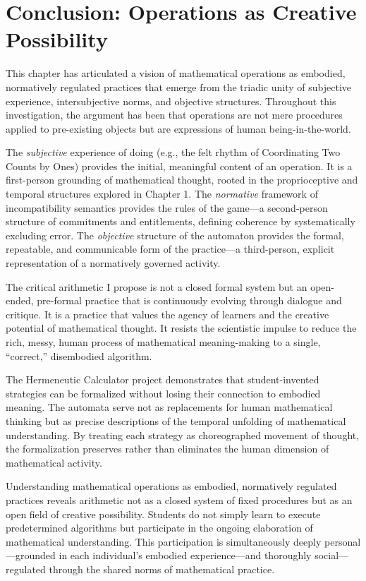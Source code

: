 \documentclass[12pt]{book}
\begin{document}
\section{Conclusion: Operations as Creative Possibility}

This chapter has articulated a vision of mathematical operations as embodied, normatively regulated practices that emerge from the triadic unity of subjective experience, intersubjective norms, and objective structures. Throughout this investigation, the argument has been that operations are not mere procedures applied to pre-existing objects but are expressions of human being-in-the-world.

The \textit{subjective} experience of doing (e.g., the felt rhythm of Coordinating Two Counts by Ones) provides the initial, meaningful content of an operation. It is a first-person grounding of mathematical thought, rooted in the proprioceptive and temporal structures explored in Chapter 1. The \textit{normative} framework of incompatibility semantics provides the rules of the game---a second-person structure of commitments and entitlements, defining coherence by systematically excluding error. The \textit{objective} structure of the automaton provides the formal, repeatable, and communicable form of the practice---a third-person, explicit representation of a normatively governed activity.

The critical arithmetic I propose is not a closed formal system but an open-ended, pre-formal practice that is continuously evolving through dialogue and critique. It is a practice that values the agency of learners and the creative potential of mathematical thought. It resists the scientistic impulse to reduce the rich, messy, human process of mathematical meaning-making to a single, \enquote{correct,} disembodied algorithm.

The Hermeneutic Calculator project demonstrates that student-invented strategies can be formalized without losing their connection to embodied meaning. The automata serve not as replacements for human mathematical thinking but as precise descriptions of the temporal unfolding of mathematical understanding. By treating each strategy as choreographed movement of thought, the formalization preserves rather than eliminates the human dimension of mathematical activity.

Understanding mathematical operations as embodied, normatively regulated practices reveals arithmetic not as a closed system of fixed procedures but as an open field of creative possibility. Students do not simply learn to execute predetermined algorithms but participate in the ongoing elaboration of mathematical understanding. This participation is simultaneously deeply personal---grounded in each individual's embodied experience---and thoroughly social---regulated through the shared norms of mathematical practice.
\end{document}
